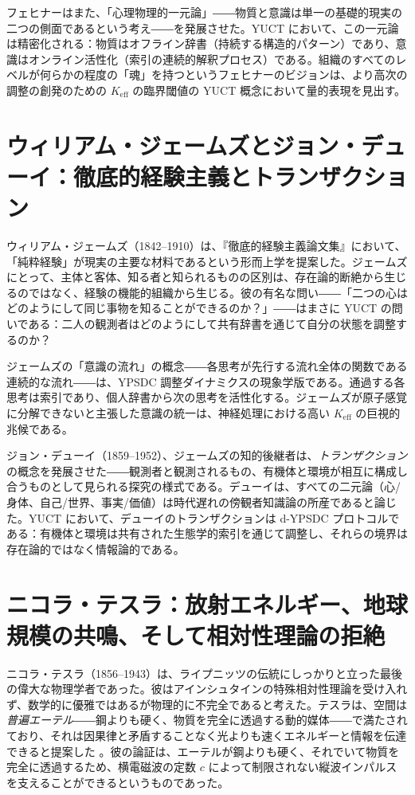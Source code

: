 \documentclass[12pt,a4paper]{article}
\begin{document}
	フェヒナーはまた、「心理物理的一元論」――物質と意識は単一の基礎的現実の二つの側面であるという考え――を発展させた。YUCT において、この一元論は精密化される：物質はオフライン辞書（持続する構造的パターン）であり、意識はオンライン活性化（索引の連続的解釈プロセス）である。組織のすべてのレベルが何らかの程度の「魂」を持つというフェヒナーのビジョンは、より高次の調整の創発のための \(K_{\mathrm{eff}}\) の臨界閾値の YUCT 概念において量的表現を見出す。
	
	\section{ウィリアム・ジェームズとジョン・デューイ：徹底的経験主義とトランザクション}
	
	ウィリアム・ジェームズ（1842–1910）は、『徹底的経験主義論文集』において、「純粋経験」が現実の主要な材料であるという形而上学を提案した。ジェームズにとって、主体と客体、知る者と知られるものの区別は、存在論的断絶から生じるのではなく、経験の機能的組織から生じる。彼の有名な問い――「二つの心はどのようにして同じ事物を知ることができるのか？」――はまさに YUCT の問いである：二人の観測者はどのようにして共有辞書を通じて自分の状態を調整するのか？
	
	ジェームズの「意識の流れ」の概念――各思考が先行する流れ全体の関数である連続的な流れ――は、YPSDC 調整ダイナミクスの現象学版である。通過する各思考は索引であり、個人辞書から次の思考を活性化する。ジェームズが原子感覚に分解できないと主張した意識の統一は、神経処理における高い \(K_{\mathrm{eff}}\) の巨視的兆候である。
	
	ジョン・デューイ（1859–1952）、ジェームズの知的後継者は、\emph{トランザクション} の概念を発展させた――観測者と観測されるもの、有機体と環境が相互に構成し合うものとして見られる探究の様式である。デューイは、すべての二元論（心/身体、自己/世界、事実/価値）は時代遅れの傍観者知識論の所産であると論じた。YUCT において、デューイのトランザクションは d-YPSDC プロトコルである：有機体と環境は共有された生態学的索引を通じて調整し、それらの境界は存在論的ではなく情報論的である。
	
	\section{ニコラ・テスラ：放射エネルギー、地球規模の共鳴、そして相対性理論の拒絶}
	
	ニコラ・テスラ（1856–1943）は、ライプニッツの伝統にしっかりと立った最後の偉大な物理学者であった。彼はアインシュタインの特殊相対性理論を受け入れず、数学的に優雅ではあるが物理的に不完全であると考えた。テスラは、空間は \emph{普遍エーテル}――鋼よりも硬く、物質を完全に透過する動的媒体――で満たされており、それは因果律と矛盾することなく光よりも速くエネルギーと情報を伝達できると提案した \cite{Tesla1932}。彼の論証は、エーテルが鋼よりも硬く、それでいて物質を完全に透過するため、横電磁波の定数 \(c\) によって制限されない縦波インパルスを支えることができるというものであった。
	
\end{document}
